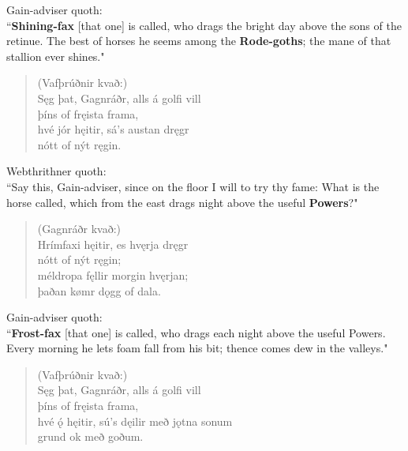 \bvb Gain-adviser quoth: \\ “\textbf{Shining-fax} [that one] is called, who drags the bright day above the sons of the retinue. The best of horses he seems among the \textbf{Rode-goths}; the mane of that stallion ever shines." \\

\begin{verse}
(Vafþrúðnir kvað:) \\%
\bva Sęg þat, Gagnráðr, \hld alls á golfi vill \\%
\ind þíns of fręista frama, \\%
hvé jór hęitir, \hld sá's austan dręgr \\%
\ind nótt of nýt ręgin.\\%
\end{verse}

\bvb Webthrithner quoth: \\ “Say this, Gain-adviser, since on the floor I will to try thy fame: What is the horse called, which from the east drags night above the useful \textbf{Powers}?" \\

\begin{verse}
(Gagnráðr kvað:) \\%
\bva Hrímfaxi hęitir, \hld es hvęrja dręgr \\%
\ind nótt of nýt ręgin; \\%
méldropa fęllir \hld morgin hvęrjan; \\%
\ind þaðan kømr dǫgg of dala.\\%
\end{verse}

\bvb Gain-adviser quoth: \\ “\textbf{Frost-fax} [that one] is called, who drags each night above the useful Powers. Every morning he lets foam fall from his bit\footnotemark[26]; thence comes dew in the valleys." \\

\begin{verse}
(Vafþrúðnir kvað:) \\%
\bva Sęg þat, Gagnráðr, \hld alls á golfi vill \\%
\ind þíns of fręista frama, \\%
hvé ǫ́ hęitir, \hld sú's dęilir með jǫtna sonum \\%
\ind grund ok með goðum.\\%
\end{verse}

